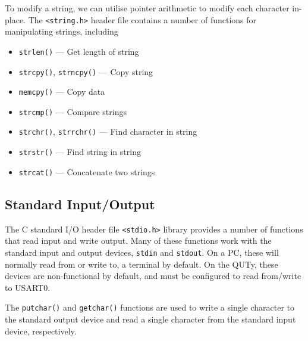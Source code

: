 \documentclass{report}
\begin{document}
To modify a string, we can utilise pointer arithmetic to modify each character in-place.
The \texttt{<string.h>} header file contains a number of functions for manipulating strings, including
\begin{itemize}
    \item \texttt{strlen()} --- Get length of string
    \item \texttt{strcpy()}, \texttt{strncpy()} --- Copy string
    \item \texttt{memcpy()} --- Copy data
    \item \texttt{strcmp()} --- Compare strings
    \item \texttt{strchr()}, \texttt{strrchr()} --- Find character in string
    \item \texttt{strstr()} --- Find string in string
    \item \texttt{strcat()} --- Concatenate two strings
\end{itemize}
\subsection{Standard Input/Output}
The C standard I/O header file \texttt{<stdio.h>} library provides a number of functions that read input
and write output. Many of these functions work with the standard input and output devices, \texttt{stdin} and \texttt{stdout}.
On a PC, these will normally read from or write to, a terminal by default. On the QUTy, these devices are non-functional by default, and must be
configured to read from/write to USART0.

The \texttt{putchar()} and \texttt{getchar()} functions are used to write a single character to the standard output device and read a single character from the standard input device, respectively.
\end{document}
